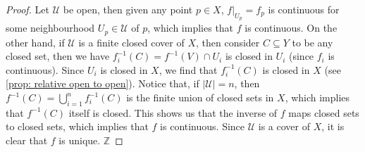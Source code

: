 \begin{proof}
  Let \(\mathcal U\) be open, then given any point \(p \in X\), \(f|_{U_p} =
  f_p\) is continuous for some neighbourhood \(U_p \in \mathcal U\) of \(p\),
  which implies that \(f\) is continuous. On the other hand, if \(\mathcal U\)
  is a finite closed cover of \(X\), then consider \(C \subseteq Y\) to be any
  closed set, then we have \(f_i^{-1}(C) = f^{-1}(V) \cap U_i\) is closed in
  \(U_i\) (since \(f_i\) is continuous). Since \(U_i\) is closed in \(X\), we
  find that \(f_i^{-1}(C)\) is closed in \(X\) (see \cref{prop: relative open to
  open}).  Notice that, if \(|\mathcal U| = n\), then \(f^{-1}(C) =
  \bigcup_{i=1}^n f_i^{-1}(C)\) is the finite union of closed sets in \(X\),
  which implies that \(f^{-1}(C)\) itself is closed. This shows us that the
  inverse of \(f\) maps closed sets to closed sets, which implies that \(f\) is
  continuous.  Since \(\mathcal U\) is a cover of \(X\), it is clear that \(f\)
  is unique. \(\mathbb{Z}\)
\end{proof}
